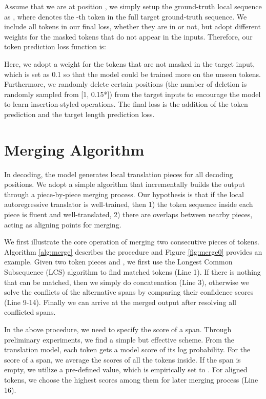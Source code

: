 \documentclass[11pt,a4paper]{article}
\begin{document}
Assume that we are at position , we simply setup the ground-truth local sequence  as , where  denotes the -th token in the full target ground-truth sequence.
We include all tokens in our final loss, whether they are in  or not, but adopt different weights for the masked tokens that do not appear in the inputs.
Therefore, our token prediction loss function is:
{\setlength\abovedisplayskip{4pt}
\setlength\belowdisplayskip{4pt} 

}
Here, we adopt a weight  for the tokens that are not masked in the target input, which is set as 0.1 so that the model could be trained more on the unseen tokens.
Furthermore, we randomly delete certain positions (the number of deletion is randomly sampled from [1, 0.15*]) from the target inputs to encourage the model to learn insertion-styled operations. The final loss is the addition of the token prediction and the target length prediction loss. 


\section{Merging Algorithm}
\label{sec:merge}

In decoding, the model generates local translation pieces for all decoding positions. We adopt a simple algorithm that incrementally builds the output through a piece-by-piece merging process. Our hypothesis is that if the local autoregressive translator is well-trained, then 1) the token sequence inside each piece is fluent and well-translated, 2) there are overlaps between nearby pieces, acting as aligning points for merging.

We first illustrate the core operation of merging two consecutive pieces of tokens. Algorithm \ref{alg:merge} describes the procedure and Figure \ref{fig:merge0} provides an example. Given two token pieces  and , we first use the Longest Common Subsequence (LCS) algorithm to find matched tokens (Line 1). If there is nothing that can be matched, then we simply do concatenation (Line 3), otherwise we solve the conflicts of the alternative spans by comparing their confidence scores (Line 9-14). 
Finally we can arrive at the merged output after resolving all conflicted spans.

In the above procedure, we need to specify the score of a span. Through preliminary experiments, we find a simple but effective scheme. From the translation model, each token gets a model score of its log probability. 
For the score of a span, we average the scores of all the tokens inside. If the span is empty, we utilize a pre-defined value, which is empirically set to . For aligned tokens, we choose the highest scores among them for later merging process (Line 16).
\end{document}
